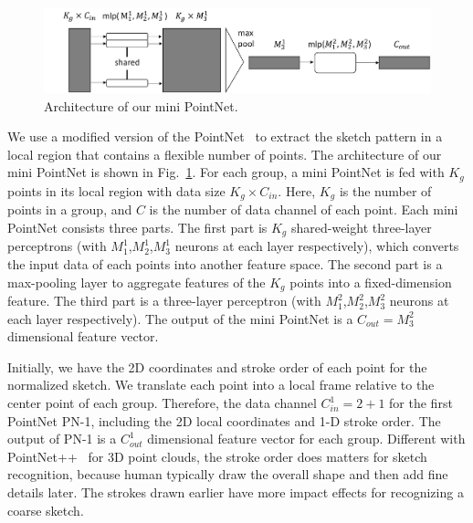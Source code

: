 \begin{figure}
	\centering
	\includegraphics[width=\columnwidth]{images/pointnet.png}
	\caption{Architecture of our mini PointNet.}
	\label{fig:miniPN}
\end{figure}
%
We use a modified version of the PointNet~\cite{qi2017pointnet} to extract the sketch pattern in a local region that contains a flexible number of points.
The architecture of our mini PointNet is shown in Fig.~\ref{fig:miniPN}.
%
%
For each group, a mini PointNet is fed with $K_g$ points in its local region with data size $K_g \times C_{in}$.
Here, $K_g$ is the number of points in a group, and $C$ is the number of data channel of each point.
Each mini PointNet consists three parts.
The first part is $K_g$ shared-weight three-layer perceptrons (with $M^{1}_1$,$M^{1}_2$,$M^{1}_3$ neurons at each layer respectively), which converts the input data of each points into another feature space.
%
The second part is a max-pooling layer to aggregate features of the $K_g$ points into a fixed-dimension feature.
%
The third part is a three-layer perceptron (with $M^{2}_1$,$M^{2}_2$,$M^{2}_3$ neurons at each layer respectively).
%
The output of the mini PointNet is a $C_{out}=M^{2}_3$ dimensional feature vector.


Initially, we have the 2{D} coordinates and stroke order of each point for the normalized sketch.
We translate each point into a local frame relative to the center point of each group.
Therefore, the data channel $C^1_{in}=2+1$ for the first PointNet PN-1, including the 2D local coordinates and 1-D stroke order.
The output of PN-1 is a $C^1_{out}$ dimensional feature vector for each group.
%
Different with PointNet++~\cite{qi2017pointnetplusplus} for 3D point clouds, the stroke order does matters for sketch recognition, because human typically draw the overall shape and then add fine details later.
%
The strokes drawn earlier have more impact effects for recognizing a coarse sketch.
%

